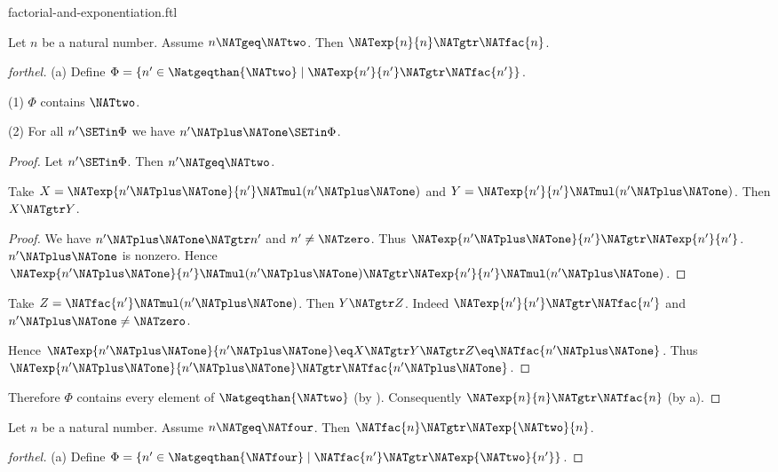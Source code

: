 \documentclass{stex}
\begin{document}
\begin{smodule}{factorial-and-exponentiation.ftl}

\begin{proposition}[forthel,id=ARITHMETIC_12_8113296594960384]
  Let $n$ be a natural number.
  Assume $n \NATgeq \NATtwo$.
  Then $\NATexp{n}{n} \NATgtr \NATfac{n}$.
\end{proposition}
\begin{proof}[forthel]
  (a) Define $\Phi = \{ n' \in \Natgeqthan{\NATtwo} \mid \NATexp{n'}{n'} \NATgtr \NATfac{n'} \}$.

  (1) $\Phi$ contains $\NATtwo$.

  (2) For all $n' \SETin \Phi$ we have $n' \NATplus \NATone \SETin \Phi$.
  \begin{proof}
    Let $n' \SETin \Phi$.
    Then $n' \NATgeq \NATtwo$.

    Take $X = \NATexp{n' \NATplus \NATone}{n'} \NATmul (n' \NATplus \NATone)$ and $Y = \NATexp{n'}{n'} \NATmul (n' \NATplus \NATone)$.
    Then $X \NATgtr Y$.
    \begin{proof}
      We have $n' \NATplus \NATone \NATgtr n'$ and $n' \neq \NATzero$.
      Thus $\NATexp{n' \NATplus \NATone}{n'} \NATgtr \NATexp{n'}{n'}$.
      $n' \NATplus \NATone$ is nonzero.
      Hence $\NATexp{n' \NATplus \NATone}{n'} \NATmul (n' \NATplus \NATone) \NATgtr \NATexp{n'}{n'} \NATmul (n' \NATplus \NATone)$.
    \end{proof}

    Take $Z = \NATfac{n'} \NATmul (n' \NATplus \NATone)$.
    Then $Y \NATgtr Z$.
    Indeed $\NATexp{n'}{n'} \NATgtr \NATfac{n'}$ and $n' \NATplus \NATone \neq \NATzero$.

    Hence $\NATexp{n' \NATplus \NATone}{n' \NATplus \NATone} \eq X \NATgtr Y \NATgtr Z \eq \NATfac{n' \NATplus \NATone}$.
    Thus $\NATexp{n' \NATplus \NATone}{n' \NATplus \NATone} \NATgtr \NATfac{n' \NATplus \NATone}$.
  \end{proof}

  Therefore $\Phi$ contains every element of $\Natgeqthan{\NATtwo}$ (by ).
  Consequently $\NATexp{n}{n} \NATgtr \NATfac{n}$ (by a).
\end{proof}

\begin{proposition}[forthel,id=ARITHMETIC_12_5413271156817920]
  Let $n$ be a natural number.
  Assume $n \NATgeq \NATfour$.
  Then $\NATfac{n} \NATgtr \NATexp{\NATtwo}{n}$.
\end{proposition}
\begin{proof}[forthel]
  (a) Define $\Phi = \{ n' \in \Natgeqthan{\NATfour} \mid \NATfac{n'} \NATgtr \NATexp{\NATtwo}{n'} \}$.


\end{proof}
\end{smodule}
\end{document}
